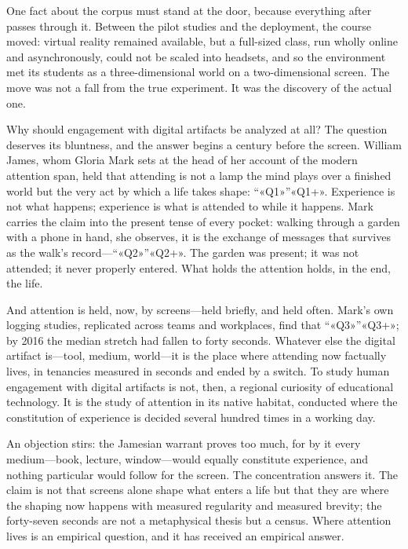 One fact about the corpus must stand at the door, because everything after passes through it. Between the pilot studies and the deployment, the course moved: virtual reality remained available, but a full-sized class, run wholly online and asynchronously, could not be scaled into headsets, and so the environment met its students as a three-dimensional world on a two-dimensional screen. The move was not a fall from the true experiment. It was the discovery of the actual one.

Why should engagement with digital artifacts be analyzed at all? The question deserves its bluntness, and the answer begins a century before the screen. William James, whom Gloria Mark sets at the head of her account of the modern attention span, held that attending is not a lamp the mind plays over a finished world but the very act by which a life takes shape: ``«Q1»''«Q1+». Experience is not what happens; experience is what is attended to while it happens. Mark carries the claim into the present tense of every pocket: walking through a garden with a phone in hand, she observes, it is the exchange of messages that survives as the walk's record---``«Q2»''«Q2+». The garden was present; it was not attended; it never properly entered. What holds the attention holds, in the end, the life.

And attention is held, now, by screens---held briefly, and held often. Mark's own logging studies, replicated across teams and workplaces, find that ``«Q3»''«Q3+»; by 2016 the median stretch had fallen to forty seconds. Whatever else the digital artifact is---tool, medium, world---it is the place where attending now factually lives, in tenancies measured in seconds and ended by a switch. To study human engagement with digital artifacts is not, then, a regional curiosity of educational technology. It is the study of attention in its native habitat, conducted where the constitution of experience is decided several hundred times in a working day.

An objection stirs: the Jamesian warrant proves too much, for by it every medium---book, lecture, window---would equally constitute experience, and nothing particular would follow for the screen. The concentration answers it. The claim is not that screens alone shape what enters a life but that they are where the shaping now happens with measured regularity and measured brevity; the forty-seven seconds are not a metaphysical thesis but a census. Where attention lives is an empirical question, and it has received an empirical answer.

